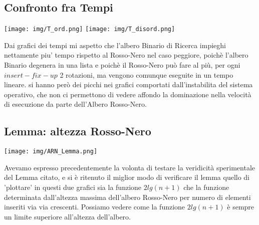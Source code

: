 \documentclass{article}
\begin{document}
\subsection{Confronto fra Tempi}

\begin{center}
    \texttt{[image: img/T\_ord.png]}
    \texttt{[image: img/T\_disord.png]}
\end{center}
Dai grafici dei tempi mi aspetto che l'albero Binario di Ricerca impieghi nettamente piu' tempo rispetto al Rosso-Nero nel caso peggiore, poichè l'albero Binario degenera in una lista e poichè il Rosso-Nero può fare al più, per ogni $insert-fix-up$ 2 rotazioni, ma vengono comunque eseguite in un tempo lineare.
si hanno però dei picchi nei grafici comportati dall'instabilita del sistema operativo, che non ci permettono di vedere affondo la dominazione nella velocità di esecuzione da parte dell'Albero Rosso-Nero.


\subsection{Lemma: altezza Rosso-Nero}

\begin{center}
    \texttt{[image: img/ARN\_Lemma.png]}
\end{center}
Avevamo espresso precedentemente la volonta di testare la veridicità sperimentale del Lemma citato, e si è ritenuto il miglior modo di verificare il lemma quello di 'plottare' in questi due grafici sia la funzione $2 lg(n+1)$ che la funzione determinata dall'altezza massima dell'albero Rosso-Nero per numero di elementi inseriti via via crescenti.
Possiamo vedere come la funzione $2 lg(n+1)$ è sempre un limite superiore all'altezza dell'albero.
\end{document}

